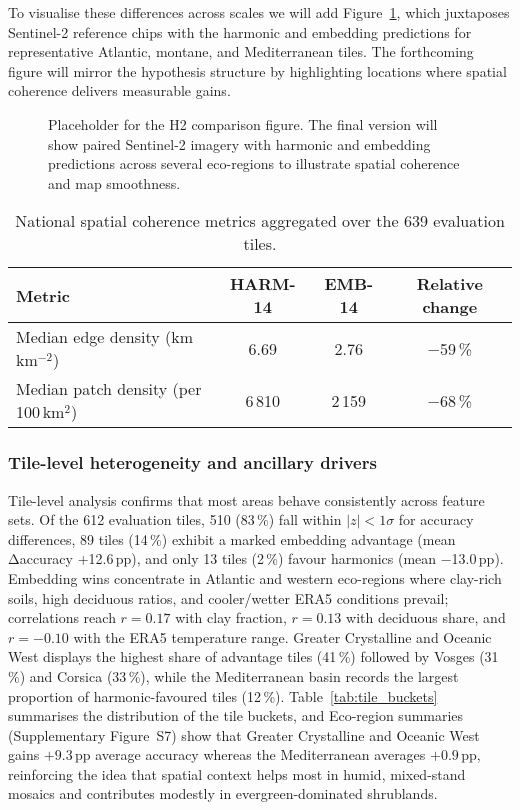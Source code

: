 \documentclass[utf8]{FrontiersinHarvard}
\begin{document}
To visualise these differences across scales we will add Figure~\ref{fig:h2_multiscale_placeholder}, which juxtaposes Sentinel-2 reference chips with the harmonic and embedding predictions for representative Atlantic, montane, and Mediterranean tiles. The forthcoming figure will mirror the hypothesis structure by highlighting locations where spatial coherence delivers measurable gains.

\begin{figure}[H]
    \centering
    \caption{Placeholder for the H2 comparison figure. The final version will show paired Sentinel-2 imagery with harmonic and embedding predictions across several eco-regions to illustrate spatial coherence and map smoothness.}
    \label{fig:h2_multiscale_placeholder}
\end{figure}

\begin{table}[H]
    \centering
    \small
    \begin{tabular}{lccc}
        \toprule
        \textbf{Metric} & \textbf{HARM-14} & \textbf{EMB-14} & \textbf{Relative change} \\
        \midrule
        Median edge density (km\,km\(^{-2}\)) & 6.69 & 2.76 & −59\,\% \\
        Median patch density (per 100\,km\(^2\)) & 6\,810 & 2\,159 & −68\,\% \\
        \bottomrule
    \end{tabular}
    \caption{National spatial coherence metrics aggregated over the 639 evaluation tiles.}
    \label{tab:coherence_summary}
\end{table}

\subsubsection{Tile-level heterogeneity and ancillary drivers}

Tile-level analysis confirms that most areas behave consistently across feature sets. Of the 612 evaluation tiles, 510 (83\,\%) fall within \(|z| < 1\sigma\) for accuracy differences, 89 tiles (14\,\%) exhibit a marked embedding advantage (mean Δaccuracy +12.6\,pp), and only 13 tiles (2\,\%) favour harmonics (mean −13.0\,pp). Embedding wins concentrate in Atlantic and western eco-regions where clay-rich soils, high deciduous ratios, and cooler/wetter ERA5 conditions prevail; correlations reach \(r=0.17\) with clay fraction, \(r=0.13\) with deciduous share, and \(r=-0.10\) with the ERA5 temperature range. Greater Crystalline and Oceanic West displays the highest share of advantage tiles (41\,\%) followed by Vosges (31\,\%) and Corsica (33\,\%), while the Mediterranean basin records the largest proportion of harmonic-favoured tiles (12\,\%). Table~\ref{tab:tile_buckets} summarises the distribution of the tile buckets, and Eco-region summaries (Supplementary Figure~S7) show that Greater Crystalline and Oceanic West gains \(+9.3\)\,pp average accuracy whereas the Mediterranean averages \(+0.9\)\,pp, reinforcing the idea that spatial context helps most in humid, mixed-stand mosaics and contributes modestly in evergreen-dominated shrublands.
\end{document}
